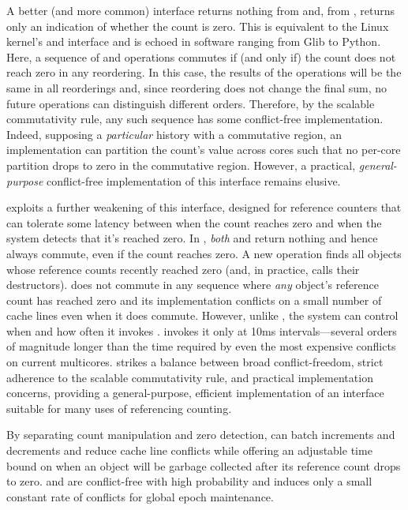 A better (and more common) interface returns nothing from 
and, from , returns only an indication of whether the count
is zero.  This is equivalent to the Linux kernel's 
and  interface and is echoed in software
ranging from Glib to Python.  Here, a sequence of  and
 operations commutes if (and only if) the count does not
reach zero in any reordering.  In this case, the results of the
operations will be the same in all reorderings and, since reordering
does not change the final sum, no future operations can distinguish
different orders.  Therefore, by the scalable commutativity rule, any
such sequence has some conflict-free implementation.  Indeed,
supposing a \emph{particular} history with a commutative region, an
implementation can partition the count's value across cores such that
no per-core partition drops to zero in the commutative region.
However, a practical, \emph{general-purpose} conflict-free
implementation of this interface remains elusive.

 exploits a further weakening of this interface, designed for
reference counters that can tolerate some latency between when the
count reaches zero and when the system detects that it's reached zero.
%
%
In , \emph{both}  and  return nothing and
hence always commute, even if the count reaches zero.  A new
 operation finds all objects whose reference counts
recently reached zero (and, in practice, calls their destructors).
 does not commute in any sequence where \emph{any}
object's reference count has reached zero and its implementation
conflicts on a small number of cache lines even when it does commute.
%
However, unlike , the system can control when and how often
it invokes .
%
\sys invokes it
only at 10ms intervals---several orders of magnitude longer than the
time required by even the most expensive conflicts on current
multicores.
%
 strikes a balance between broad conflict-freedom, strict
adherence to the scalable commutativity rule, and practical
implementation concerns, providing a general-purpose, efficient
implementation of an interface suitable for many uses of referencing
counting.

By separating count manipulation and zero detection,  can
batch increments and decrements and
reduce cache line conflicts while offering an adjustable time bound
on when an object will be garbage collected after its reference count
drops to zero.   and  are conflict-free with high
probability and  induces only a small constant rate of
conflicts for global epoch maintenance.

